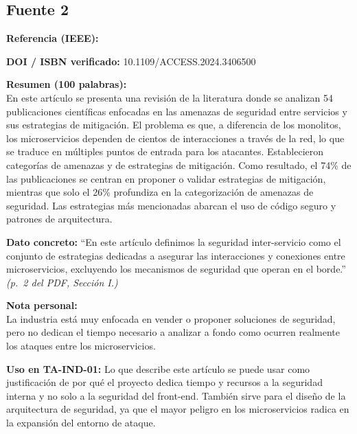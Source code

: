 \documentclass[11pt,a4paper]{article}
\newcommand{\ficha}[7]{%
  \begin{tcolorbox}[colback=white,colframe=black!60,
    title={Ficha bibliográfica},breakable]
    \textbf{Referencia (IEEE):}\\
    \fullcite{#1}

    \medskip
    \textbf{DOI / ISBN verificado:} #2

    \medskip
    \textbf{Resumen (100 palabras):}\\
    #3

    \medskip
    \textbf{Dato concreto:} #4 \textit{(#5)}

    \medskip
    \textbf{Nota personal:}\\
    #6

    \medskip
    \textbf{Uso en TA-IND-01:} #7
  \end{tcolorbox}
  \vspace{1em}
}
\begin{document}
\subsection{Fuente 2}
\ficha{fuente2}{10.1109/ACCESS.2024.3406500}{En este artículo se presenta una revisión de la literatura donde se analizan 54 publicaciones científicas enfocadas en las amenazas de seguridad entre servicios y sus estrategias de mitigación. El problema es que, a diferencia de los monolitos, los microservicios dependen de cientos de interacciones a través de la red, lo que se traduce en múltiples puntos de entrada para los atacantes. Establecieron categorías de amenazas y de estrategias de mitigación. Como resultado, el 74\% de las publicaciones se centran en proponer o validar estrategias de mitigación, mientras que solo el 26\% profundiza en la categorización de amenazas de seguridad. Las estrategias más mencionadas abarcan el uso de código seguro y patrones de arquitectura. }{\enquote{En este artículo definimos la seguridad inter-servicio como el conjunto de estrategias dedicadas a asegurar las interacciones y conexiones entre microservicios, excluyendo los mecanismos de seguridad que operan en el borde.}}{p.~2 del PDF, Sección I.}{La industria está muy enfocada en vender o proponer soluciones de seguridad, pero no dedican el tiempo necesario a analizar a fondo como ocurren realmente los ataques entre los microservicios.}{Lo que describe este artículo se puede usar como justificación de por qué el proyecto dedica tiempo y recursos a la seguridad interna y no solo a la seguridad del front-end. También sirve para el diseño de la arquitectura de seguridad, ya que el mayor peligro en los microservicios radica en la expansión del entorno de ataque.}
\end{document}
